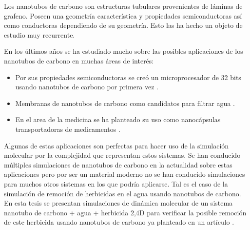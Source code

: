 Los nanotubos de carbono son estructuras tubulares provenientes de láminas de grafeno. Poseen una geometría característica y propiedades semiconductoras así como conductoras dependiendo de su geometría. Esto las ha hecho un objeto de estudio muy recurrente.

En los últimos años se ha estudiado mucho sobre las posibles aplicaciones de los nanotubos de carbono en muchas áreas de interés:

\begin{itemize}
    \item Por sus propiedades semiconductoras se creó un microprocesador de 32 bits usando nanotubos de carbono por primera vez \cite{Hills2019}.
    \item Membranas de nanotubos de carbono como candidatos para filtrar agua \cite{IHSANULLAH2019307}.
    \item En el area de la medicina se ha planteado su uso como nanocápsulas transportadoras de medicamentos \cite{hilder2008}.
\end{itemize}

Algunas de estas aplicaciones son perfectas para hacer uso de la simulación molecular por la complejidad que representan estos sistemas. Se han conducido múltiples simulaciones de nanotubos de carbono en la actualidad sobre estas aplicaciones pero por ser un material moderno no se han conducido simulaciones para muchos otros sistemas en los que podría aplicarse. Tal es el caso de la simulación de remoción de herbicidas en el agua usando nanotubos de carbono. En esta tesis se presentan simulaciones de dinámica molecular de un sistema nanotubo de carbono + agua + herbicida 2,4D para verificar la posible remoción de este herbicida usando nanotubos de carbono ya planteado en un artículo \cite{rocha2017}.
